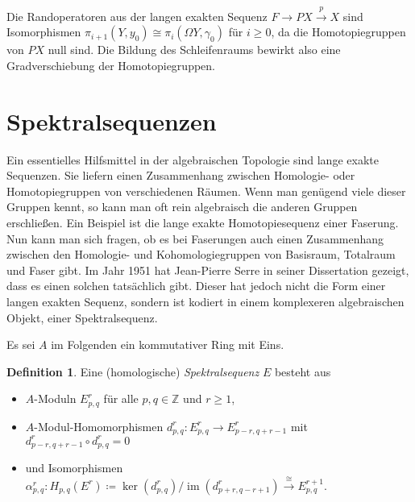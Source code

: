\documentclass[11pt, a4paper, german]{article}
\theoremstyle{definition}
\newtheorem{defn}[lem]{Definition}
\theoremstyle{remark}
\newtheorem*{bem}{Bemerkung}
\newcommand{\Z}{\mathbb{Z}} %
\DeclareMathOperator{\Hom}{Hom} %
\DeclareMathOperator{\im}{im} %
\begin{document}
Die Randoperatoren aus der langen exakten Sequenz $F \to PX \xrightarrow{p} X$ sind Isomorphismen $\pi_{i+1}(Y, y_0) \cong \pi_i(\Omega Y, \gamma_0)$ für $i \geq 0$, da die Homotopiegruppen von $PX$ null sind.
Die Bildung des Schleifenraums bewirkt also eine Gradverschiebung der Homotopiegruppen.


\section{Spektralsequenzen}

Ein essentielles Hilfsmittel in der algebraischen Topologie sind lange exakte Sequenzen.
Sie liefern einen Zusammenhang zwischen Homologie- oder Homotopiegruppen von verschiedenen Räumen.
Wenn man genügend viele dieser Gruppen kennt, so kann man oft rein algebraisch die anderen Gruppen erschließen.
Ein Beispiel ist die lange exakte Homotopiesequenz einer Faserung.
Nun kann man sich fragen, ob es bei Faserungen auch einen Zusammenhang zwischen den Homologie- und Kohomologiegruppen von Basisraum, Totalraum und Faser gibt.
Im Jahr 1951 hat Jean-Pierre Serre in seiner Dissertation \cite{serre:thesis} gezeigt, dass es einen solchen tatsächlich gibt.
Dieser hat jedoch nicht die Form einer langen exakten Sequenz, sondern ist kodiert in einem komplexeren algebraischen Objekt, einer Spektralsequenz.

Es sei $A$ im Folgenden ein kommutativer Ring mit Eins.

\begin{defn}
  Eine (homologische) \emph{Spektralsequenz} $E$ besteht aus
  \begin{itemize}
    \item $A$-Moduln $E^r_{p,q}$ für alle $p, q \in \Z$ und $r \geq 1$,
    \item $A$-Modul-Homomorphismen $d^r_{p,q} : E^r_{p,q} \to E^r_{p-r,q+r-1}$ mit $d^r_{p-r,q+r-1} \circ d^r_{p,q} = 0$
    \item und Isomorphismen $\alpha^r_{p,q} : H_{p,q}(E^r) \!\coloneqq\! \ker(d ^r_{p,q}) / \im(d^r_{p+r,q-r+1}) \xrightarrow{\cong} E^{r+1}_{p,q}$.
  \end{itemize}
\end{defn}
\end{document}
